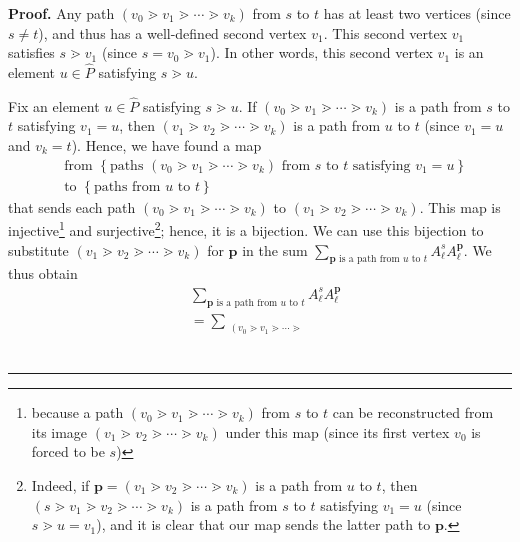 \documentclass[numbers=enddot,12pt,final,onecolumn,notitlepage]{scrartcl}%
\theoremstyle{definition}
\newenvironment{verlong}{}{}
\newcommand{\downslack}{A}
\newenvironment{proof}[1][Proof]{\noindent\textbf{#1.} }{\ \rule{0.5em}{0.5em}}
\let\sumnonlimits\sum
\renewcommand{\sum}{\sumnonlimits\limits}
\begin{document}
\begin{verlong}


\begin{proof}
Any path $\left(  v_{0}\gtrdot v_{1}\gtrdot\cdots\gtrdot v_{k}\right)  $ from
$s$ to $t$ has at least two vertices (since $s\neq t$), and thus has a
well-defined second vertex $v_{1}$. This second vertex $v_{1}$ satisfies
$s\gtrdot v_{1}$ (since $s=v_{0}\gtrdot v_{1}$). In other words, this second
vertex $v_{1}$ is an element $u\in\widehat{P}$ satisfying $s\gtrdot u$.

Fix an element $u\in\widehat{P}$ satisfying $s\gtrdot u$. If $\left(
v_{0}\gtrdot v_{1}\gtrdot\cdots\gtrdot v_{k}\right)  $ is a path from $s$ to
$t$ satisfying $v_{1}=u$, then $\left(  v_{1}\gtrdot v_{2}\gtrdot\cdots\gtrdot
v_{k}\right)  $ is a path from $u$ to $t$ (since $v_{1}=u$ and $v_{k}=t$).
Hence, we have found a map
\begin{align*}
&  \text{from }\left\{  \text{paths }\left(  v_{0}\gtrdot v_{1}\gtrdot
\cdots\gtrdot v_{k}\right)  \text{ from }s\text{ to }t\text{ satisfying }%
v_{1}=u\right\} \\
&  \text{to }\left\{  \text{paths from }u\text{ to }t\right\}
\end{align*}
that sends each path $\left(  v_{0}\gtrdot v_{1}\gtrdot\cdots\gtrdot
v_{k}\right)  $ to $\left(  v_{1}\gtrdot v_{2}\gtrdot\cdots\gtrdot
v_{k}\right)  $. This map is injective\footnote{because a path $\left(
v_{0}\gtrdot v_{1}\gtrdot\cdots\gtrdot v_{k}\right)  $ from $s$ to $t$ can be
reconstructed from its image $\left(  v_{1}\gtrdot v_{2}\gtrdot\cdots\gtrdot
v_{k}\right)  $ under this map (since its first vertex $v_{0}$ is forced to be
$s$)} and surjective\footnote{Indeed, if $\mathbf{p}=\left(  v_{1}\gtrdot
v_{2}\gtrdot\cdots\gtrdot v_{k}\right)  $ is a path from $u$ to $t$, then
$\left(  s\gtrdot v_{1}\gtrdot v_{2}\gtrdot\cdots\gtrdot v_{k}\right)  $ is a
path from $s$ to $t$ satisfying $v_{1}=u$ (since $s\gtrdot u=v_{1}$), and it
is clear that our map sends the latter path to $\mathbf{p}$.}; hence, it is a
bijection. We can use this bijection to substitute $\left(  v_{1}\gtrdot
v_{2}\gtrdot\cdots\gtrdot v_{k}\right)  $ for $\mathbf{p}$ in the sum
$\sum_{\mathbf{p}\text{ is a path from }u\text{ to }t}\downslack_{\ell}%
^{s}\downslack_{\ell}^{\mathbf{p}}$. We thus obtain
\begin{align}
&  \sum_{\mathbf{p}\text{ is a path from }u\text{ to }t}\downslack_{\ell}%
^{s}\downslack_{\ell}^{\mathbf{p}}\nonumber\\
&  =\sum_{\substack{\left(  v_{0}\gtrdot v_{1}\gtrdot\cdots\gtrdot
}}
\end{align}
\end{proof}
\end{verlong}
\end{document}
